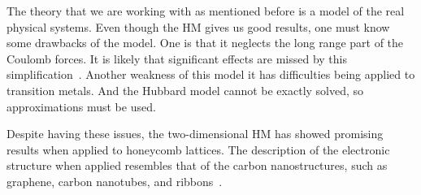 The theory that we are working with as mentioned before is a model of the real physical systems. Even though the HM gives us good results, one must know some drawbacks of the model. One is that it neglects the long range part of the Coulomb forces. It is likely that significant effects are missed by this simplification~\cite{mott}. Another weakness of this model it has difficulties being applied to transition metals. And the Hubbard model cannot be exactly solved, so approximations must be used.

Despite having these issues, the two-dimensional HM has showed promising results when applied to honeycomb lattices. The description of the electronic structure when applied resembles that of the carbon nanostructures, such as graphene, carbon nanotubes, and ribbons~\cite{graphhmc}.

